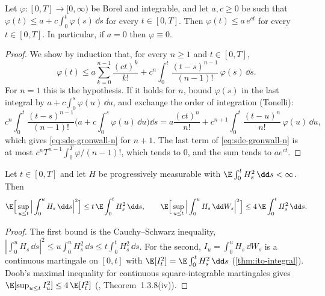 \begin{lemma}[Gronwall]\label{lem:sde-gronwall}
Let $\varphi:[0,T]\to[0,\infty)$ be Borel and integrable, and let $a,c\ge0$ be such that
$\varphi(t)\le a+c\int_0^t\varphi(s)\,\dd s$ for every $t\in[0,T]$. Then
$\varphi(t)\le a\,e^{ct}$ for every $t\in[0,T]$. In particular, if $a=0$ then $\varphi\equiv0$.
\end{lemma}

\begin{proof}
We show by induction that, for every $n\ge1$ and $t\in[0,T]$,
\begin{equation}\label{eq:sde-gronwall-n}
  \varphi(t)\le a\sum_{k=0}^{n-1}\frac{(ct)^k}{k!}
  +c^n\int_0^t\frac{(t-s)^{n-1}}{(n-1)!}\,\varphi(s)\,\dd s .
\end{equation}
For $n=1$ this is the hypothesis. If it holds for $n$, bound $\varphi(s)$ in the last
integral by $a+c\int_0^s\varphi(u)\,\dd u$, and exchange the order of integration (Tonelli):
\[
  c^n\int_0^t\frac{(t-s)^{n-1}}{(n-1)!}\Big(a+c\int_0^s\varphi(u)\,\dd u\Big)\dd s
  =a\frac{(ct)^n}{n!}+c^{n+1}\int_0^t\frac{(t-u)^n}{n!}\,\varphi(u)\,\dd u ,
\]
which gives \eqref{eq:sde-gronwall-n} for $n+1$. The last term of
\eqref{eq:sde-gronwall-n} is at most $c^nT^{n-1}\int_0^T\varphi/(n-1)!$, which tends to $0$,
and the sum tends to $ae^{ct}$.
\end{proof}

\begin{lemma}\label{lem:sde-estimates}
Let $t\in[0,T]$ and let $H$ be progressively measurable with
$\E\int_0^tH_s^2\,\dd s<\infty$. Then
\[
  \E\Big[\sup_{u\le t}\Big|\int_0^uH_s\,\dd s\Big|^2\Big]\le t\,\E\int_0^tH_s^2\,\dd s,
  \qquad
  \E\Big[\sup_{u\le t}\Big|\int_0^uH_s\,\dd W_s\Big|^2\Big]\le 4\,\E\int_0^tH_s^2\,\dd s .
\]
\end{lemma}

\begin{proof}
The first bound is the Cauchy--Schwarz inequality,
$|\int_0^uH_s\,\dd s|^2\le u\int_0^uH_s^2\,\dd s\le t\int_0^tH_s^2\,\dd s$. For the second,
$I_u=\int_0^uH_s\,\dd W_s$ is a continuous martingale on $[0,t]$ with
$\E[I_t^2]=\E\int_0^tH_s^2\,\dd s$ (\cref{thm:ito-integral}). Doob's maximal inequality for
continuous square-integrable martingales gives $\E[\sup_{u\le t}I_u^2]\le4\,\E[I_t^2]$
(\textcite{karatzas-shreve}, Theorem~1.3.8(iv)).
\end{proof}

